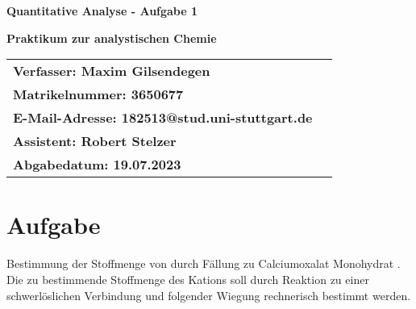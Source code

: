 \documentclass[12pt]{scrartcl} %
\begin{document}
\begin{titlepage}
\begin{center}
\vspace*{2cm}
\begin{LARGE}
\vspace*{1cm}
\textbf{\textsf{Quantitative Analyse - Aufgabe 1\\}}
\end{LARGE}
\vspace*{1cm}
\textbf{\textsf{Praktikum zur analystischen Chemie}}\\
\vspace*{1.5cm}
\begin{table}[H]
\sffamily
\hspace*{3cm}\begin{tabular}{>{\bfseries}l>{\bfseries}l}
Verfasser: Maxim Gilsendegen\\
Matrikelnummer: 3650677\\
E-Mail-Adresse: 182513@stud.uni-stuttgart.de\\
Assistent: Robert Stelzer\\
Abgabedatum: 19.07.2023\\
\end{tabular}
\end{table}
\end{center}
\end{titlepage}
\renewcommand{\thepage}{\Roman{page}}\setcounter{page}{1}
\tableofcontents %
\newpage
\renewcommand{\thepage}{\arabic{page}}\setcounter{page}{1}

\section{Aufgabe}
Bestimmung der Stoffmenge von  durch Fällung zu Calciumoxalat Monohydrat .\\
Die zu bestimmende Stoffmenge des Kations soll durch Reaktion zu einer schwerlöslichen Verbindung und folgender Wiegung rechnerisch bestimmt werden.
\end{document}
